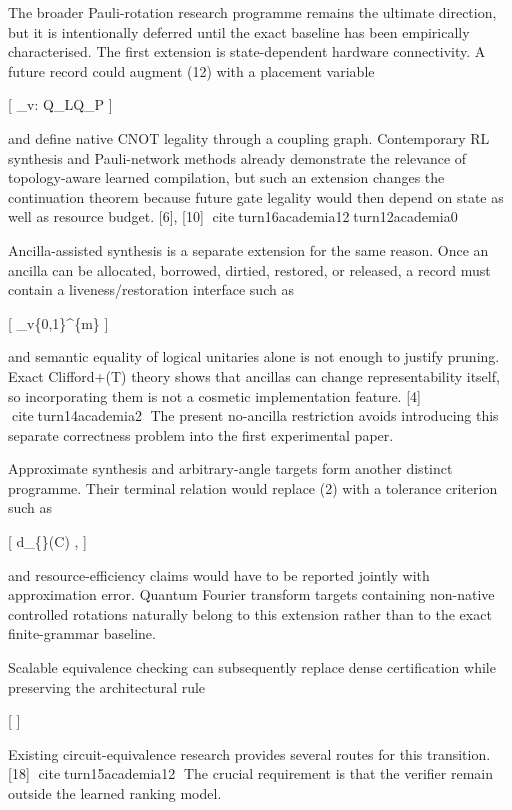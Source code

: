 \documentclass[
]{article}
\begin{document}
The broader Pauli-rotation research programme remains the ultimate
direction, but it is intentionally deferred until the exact baseline has
been empirically characterised. The first extension is state-dependent
hardware connectivity. A future record could augment (12) with a
placement variable

{[} \pi\_v: \mathcal Q\_L\rightarrow\mathcal Q\_P {]}

and define native CNOT legality through a coupling graph. Contemporary
RL synthesis and Pauli-network methods already demonstrate the relevance
of topology-aware learned compilation, but such an extension changes the
continuation theorem because future gate legality would then depend on
state as well as resource budget. {[}6{]}, {[}10{]}
citeturn16academia12turn12academia0

Ancilla-assisted synthesis is a separate extension for the same reason.
Once an ancilla can be allocated, borrowed, dirtied, restored, or
released, a record must contain a liveness/restoration interface such as

{[} \boldsymbol\ell\_v\in\{0,1\}\^{}\{m\} {]}

and semantic equality of logical unitaries alone is not enough to
justify pruning. Exact Clifford+(T) theory shows that ancillas can
change representability itself, so incorporating them is not a cosmetic
implementation feature. {[}4{]} citeturn14academia2 The present
no-ancilla restriction avoids introducing this separate correctness
problem into the first experimental paper.

Approximate synthesis and arbitrary-angle targets form another distinct
programme. Their terminal relation would replace (2) with a tolerance
criterion such as

{[} d\_\{\}(C) \le\epsilon,  {]}

and resource-efficiency claims would have to be reported jointly with
approximation error. Quantum Fourier transform targets containing
non-native controlled rotations naturally belong to this extension
rather than to the exact finite-grammar baseline.

Scalable equivalence checking can subsequently replace dense
certification while preserving the architectural rule

{[}   {]}

Existing circuit-equivalence research provides several routes for this
transition. {[}18{]} citeturn15academia12 The crucial requirement is
that the verifier remain outside the learned ranking model.
\end{document}
